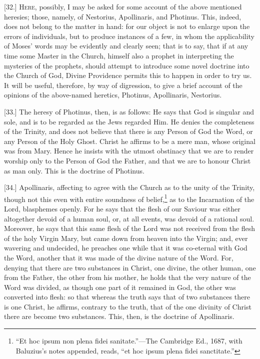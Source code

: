 [32.] \textsc{Here}, possibly, I may be asked for some account of the above mentioned heresies; those, namely, of Nestorius, Apollinaris, and Photinus. This, indeed, does not belong to the matter in hand: for our object is not to enlarge upon the errors of individuals, but to produce instances of a few, in whom the applicability of Moses’ words may be evidently and clearly seen; that is to say, that if at any time some Master in the Church, himself also a prophet in interpreting the mysteries of the prophets, should attempt to introduce some novel doctrine into the Church of God, Divine Providence permits this to happen in order to try us. It will be useful, therefore, by way of digression, to give a brief account of the opinions of the above-named heretics, Photinus, Apollinaris, Nestorius.

[33.] The heresy of Photinus, then, is as follows: He says that God is singular and sole, and is to be regarded as the Jews regarded Him. He denies the completeness of the Trinity, and does not believe that there is any Person of God the Word, or any Person of the Holy Ghost. Christ he affirms to be a mere man, whose original was from Mary. Hence he insists with the utmost obstinacy that we are to render worship only to the Person of God the Father, and that we are to honour Christ as man only. This is the doctrine of Photinus.

[34.] Apollinaris, affecting to agree with the Church as to the unity of the Trinity, though not this even with entire soundness of belief,\footnote{“Et hoc ipsum non plena fidei sanitate.”—The Cambridge Ed., 1687, with Baluzius’s notes appended, reads, “et hoc ipsum plena fidei sanctitate.”} as to the Incarnation of the Lord, blasphemes openly. For he says that the flesh of our Saviour was either altogether devoid of a human soul, or, at all events, was devoid of a rational soul. Moreover, he says that this same flesh of the Lord was not received from the flesh of the holy Virgin Mary, but came down from heaven into the Virgin; and, ever wavering and undecided, he preaches one while that it was co-eternal with God the Word, another that it was made of the divine nature of the Word. For, denying that there are two substances in Christ, one divine, the other human, one from the Father, the other from his mother, he holds that the very nature of the Word was divided, as though one part of it remained in God, the other was converted into flesh: so that whereas the truth says that of two substances there is one Christ, he affirms, contrary to the truth, that of the one divinity of Christ there are become two substances. This, then, is the doctrine of Apollinaris.

